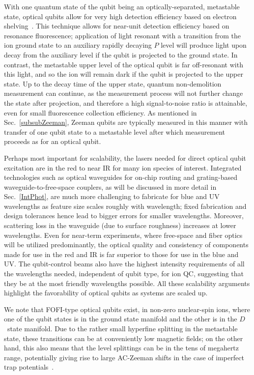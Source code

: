 \documentclass[%
12pt,
 amsmath,amssymb,
]{revtex4-2}
\begin{document}
With one quantum state of the qubit being an optically-separated, metastable state, optical qubits allow for very high detection efficiency based on electron shelving~\cite{dehmelt_shelving}.  This technique allows for near-unit detection efficiency based on resonance fluorescence; application of light resonant with a transition from the ion ground state to an auxiliary rapidly decaying $P$ level will produce light upon decay from the auxiliary level if the qubit is projected to the ground state.  In contrast, the metastable upper level of the optical qubit is far off-resonant with this light, and so the ion will remain dark if the qubit is projected to the upper state.  Up to the decay time of the upper state, quantum non-demolition measurement can continue, as the measurement process will not further change the state after projection, and therefore a high signal-to-noise ratio is attainable, even for small fluorescence collection efficiency.  As mentioned in Sec.~\ref{subsubZeeman}, Zeeman qubits are typically measured in this manner with transfer of one qubit state to a metastable level after which measurement proceeds as for an optical qubit.

Perhaps most important for scalability, the lasers needed for direct optical qubit excitation are in the red to near IR for many ion species of interest.  Integrated technologies such as optical waveguides for on-chip routing and grating-based waveguide-to-free-space couplers, as will be discussed in more detail in Sec.~\ref{IntPhot}, are much more challenging to fabricate for blue and UV wavelengths as feature size scales roughly with wavelength; fixed fabrication and design tolerances hence lead to bigger errors for smaller wavelengths.  Moreover, scattering loss in the waveguide (due to surface roughness) increases at lower wavelengths.  Even for near-term experiments, where free-space and fiber optics will be utilized predominantly, the optical quality and consistency of components made for use in the red and IR is far superior to those for use in the blue and UV.  The qubit-control beams also have the highest intensity requirements of all the wavelengths needed, independent of qubit type, for ion QC, suggesting that they be at the most friendly wavelengths possible.  All these scalability arguments highlight the favorability of optical qubits as systems are scaled up.

We note that FOFI-type optical qubits exist, in non-zero nuclear-spin ions, where one of the qubit states is in the ground state manifold and the other is in the $D$~state manifold.  Due to the rather small hyperfine splitting in the metastable state, these transitions can be at conveniently low magnetic fields; on the other hand, this also means that the level splittings can be in the tens of megahertz range, potentially giving rise to large AC-Zeeman shifts in the case of imperfect trap potentials~\cite{PhysRevA.75.032506}.
\end{document}
